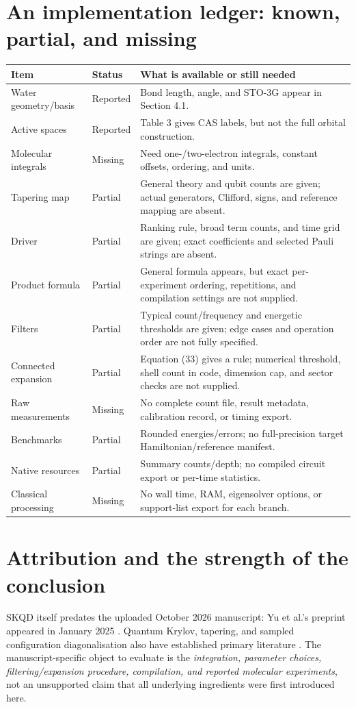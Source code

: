 \documentclass[11pt,a4paper,oneside]{report}
\begin{document}
\section{An implementation ledger: known, partial, and missing}
\begin{longtable}{@{}p{42mm}p{18mm}p{90mm}@{}}
\toprule Item & Status & What is available or still needed\\\midrule\endhead
Water geometry/basis & Reported & Bond length, angle, and STO-3G appear in Section 4.1.\\
Active spaces & Reported & Table 3 gives CAS labels, but not the full orbital construction.\\
Molecular integrals & Missing & Need one-/two-electron integrals, constant offsets, ordering, and units.\\
Tapering map & Partial & General theory and qubit counts are given; actual generators, Clifford, signs, and reference mapping are absent.\\
Driver & Partial & Ranking rule, broad term counts, and time grid are given; exact coefficients and selected Pauli strings are absent.\\
Product formula & Partial & General formula appears, but exact per-experiment ordering, repetitions, and compilation settings are not supplied.\\
Filters & Partial & Typical count/frequency and energetic thresholds are given; edge cases and operation order are not fully specified.\\
Connected expansion & Partial & Equation (33) gives a rule; numerical threshold, shell count in code, dimension cap, and sector checks are not supplied.\\
Raw measurements & Missing & No complete count file, result metadata, calibration record, or timing export.\\
Benchmarks & Partial & Rounded energies/errors; no full-precision target Hamiltonian/reference manifest.\\
Native resources & Partial & Summary counts/depth; no compiled circuit export or per-time statistics.\\
Classical processing & Missing & No wall time, RAM, eigensolver options, or support-list export for each branch.\\\bottomrule
\end{longtable}

\section{Attribution and the strength of the conclusion}
SKQD itself predates the uploaded October 2026 manuscript: Yu et al.'s preprint appeared in January 2025 \cite{yu}. Quantum Krylov, tapering, and sampled configuration diagonalisation also have established primary literature \cite{stair,bravyi,kanno,robledo}. The manuscript-specific object to evaluate is the \emph{integration, parameter choices, filtering/expansion procedure, compilation, and reported molecular experiments}, not an unsupported claim that all underlying ingredients were first introduced here.
\end{document}
